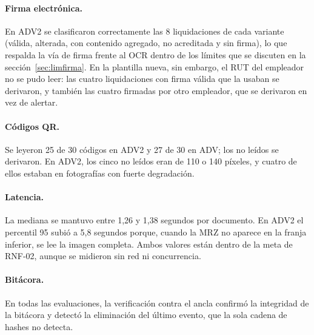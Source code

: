 \documentclass[11pt,a4paper]{article}
\begin{document}
\paragraph{Firma electrónica.} En ADV2 se clasificaron correctamente las 8 liquidaciones de cada variante (válida, alterada, con contenido agregado, no acreditada y sin firma), lo que respalda la vía de firma frente al OCR dentro de los límites que se discuten en la sección~\ref{sec:limfirma}. En la plantilla nueva, sin embargo, el RUT del empleador no se pudo leer: las cuatro liquidaciones con firma válida que la usaban se derivaron, y también las cuatro firmadas por otro empleador, que se derivaron en vez de alertar.

\paragraph{Códigos QR.} Se leyeron 25 de 30 códigos en ADV2 y 27 de 30 en ADV; los no leídos se derivaron. En ADV2, los cinco no leídos eran de 110 o 140 píxeles, y cuatro de ellos estaban en fotografías con fuerte degradación.

\paragraph{Latencia.} La mediana se mantuvo entre 1,26 y 1,38 segundos por documento. En ADV2 el percentil 95 subió a 5,8 segundos porque, cuando la MRZ no aparece en la franja inferior, se lee la imagen completa. Ambos valores están dentro de la meta de RNF-02, aunque se midieron sin red ni concurrencia.

\paragraph{Bitácora.} En todas las evaluaciones, la verificación contra el ancla confirmó la integridad de la bitácora y detectó la eliminación del último evento, que la sola cadena de hashes no detecta.
\end{document}
